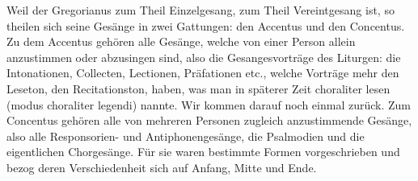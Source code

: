 Weil der Gregorianus zum Theil Einzelgesang, zum Theil Vereintgesang ist, so theilen sich seine Gesänge in zwei Gattungen: den Accentus und den Concentus. Zu dem Accentus gehören alle Gesänge, welche von einer
Person allein anzustimmen oder abzusingen sind, also die Gesangesvorträge des Liturgen: die Intonationen, Collecten, Lectionen, Präfationen etc., welche Vorträge mehr den Leseton, den Recitationston, haben, was man in späterer Zeit choraliter lesen (modus choraliter legendi) nannte. Wir kommen darauf noch einmal zurück. Zum Concentus gehören alle von mehreren Personen zugleich anzustimmende Gesänge, also alle Responsorien- und Antiphonengesänge, die Psalmodien und die eigentlichen Chorgesänge. Für sie waren bestimmte Formen vorgeschrieben und bezog deren Verschiedenheit sich auf Anfang, Mitte und Ende.

